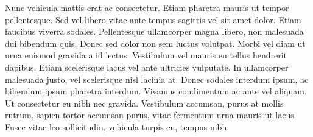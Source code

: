 \documentclass[11pt,a4paper]{article}
\begin{document}
Nunc vehicula mattis erat ac consectetur. Etiam pharetra mauris ut tempor pellentesque. Sed vel libero vitae ante tempus sagittis vel sit amet dolor. Etiam faucibus viverra sodales. Pellentesque ullamcorper magna libero, non malesuada dui bibendum quis. Donec sed dolor non sem luctus volutpat. Morbi vel diam ut urna euismod gravida a id lectus. Vestibulum vel mauris eu tellus hendrerit dapibus. Etiam scelerisque lacus vel ante ultricies vulputate. In ullamcorper malesuada justo, vel scelerisque nisl lacinia at. Donec sodales interdum ipsum, ac bibendum ipsum pharetra interdum. Vivamus condimentum ac ante vel aliquam. Ut consectetur eu nibh nec gravida. Vestibulum accumsan, purus at mollis rutrum, sapien tortor accumsan purus, vitae fermentum urna mauris ut lacus. Fusce vitae leo sollicitudin, vehicula turpis eu, tempus nibh.
\end{document}
